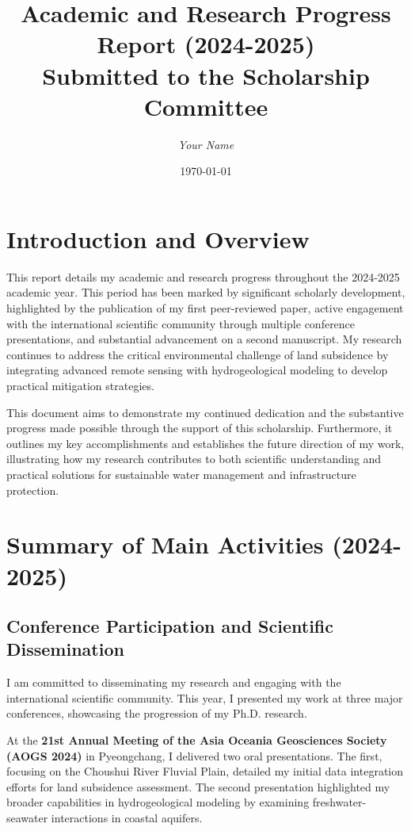 \documentclass[12pt, a4paper]{article}
\title{
	\huge{\textbf{Academic and Research Progress Report (2024-2025)}} \\
	\vspace{1cm}
	\large{Submitted to the Scholarship Committee} \\
	\vspace{2cm}
}
\author{\textit{Your Name}}
\date{\today}
\begin{document}
	
	\maketitle
	\thispagestyle{empty}
	\newpage
	
	\tableofcontents
	\newpage
	
	\section{Introduction and Overview}
	
	This report details my academic and research progress throughout the 2024-2025 academic year. This period has been marked by significant scholarly development, highlighted by the publication of my first peer-reviewed paper, active engagement with the international scientific community through multiple conference presentations, and substantial advancement on a second manuscript. My research continues to address the critical environmental challenge of land subsidence by integrating advanced remote sensing with hydrogeological modeling to develop practical mitigation strategies.
	
	This document aims to demonstrate my continued dedication and the substantive progress made possible through the support of this scholarship. Furthermore, it outlines my key accomplishments and establishes the future direction of my work, illustrating how my research contributes to both scientific understanding and practical solutions for sustainable water management and infrastructure protection.
	
	\section{Summary of Main Activities (2024-2025)}
	
	\subsection{Conference Participation and Scientific Dissemination}
	
	I am committed to disseminating my research and engaging with the international scientific community. This year, I presented my work at three major conferences, showcasing the progression of my Ph.D. research.
	
	At the \textbf{21st Annual Meeting of the Asia Oceania Geosciences Society (AOGS 2024)} in Pyeongchang, I delivered two oral presentations. The first, focusing on the Choushui River Fluvial Plain, detailed my initial data integration efforts for land subsidence assessment. The second presentation highlighted my broader capabilities in hydrogeological modeling by examining freshwater-seawater interactions in coastal aquifers.
	
\end{document}
